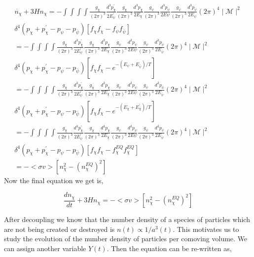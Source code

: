 \documentclass[12pt]{report}
\begin{document}
\begin{multline*}
\dot{n_\chi}+3Hn_\chi = -\int \int \int \int \frac{g_\chi}{(2 \pi)^3} \frac{d^3p^\prime_\chi}{2E^\prime_\psi} \frac{g_\chi}{(2 \pi)^3} \frac{d^3p_\chi}{2E_\chi} \frac{g_\psi}{(2 \pi)^3} \frac{d^3p_\psi}{2E\psi} \frac{g_{\bar{\psi}}}{(2 \pi)^3} \frac{d^3p_{\bar{\psi}}}{2E_{\bar{\psi}}} (2 \pi)^4 \mid \mathcal{M} \mid^2 \\
\delta^4(p_\chi + p^\prime_\chi - p_\psi - p_{\bar{\psi}})\left[f_\chi f_\chi- f_\psi f_{\bar{\psi}} \right] \\
= -\int \int \int \int \frac{g_\chi}{(2 \pi)^3} \frac{d^3p ^\prime_\chi}{2E^\prime_\psi} \frac{g_\chi}{(2 \pi)^3} \frac{d^3p_\chi}{2E_\chi} \frac{g_\psi}{(2 \pi)^3} \frac{d^3p_\psi}{2E\psi} \frac{g_{\bar{\psi}}}{(2 \pi)^3} \frac{d^3p_{\bar{\psi}}}{2E_{\bar{\psi}}} (2 \pi)^4 \mid \mathcal{M} \mid^2 \\
\delta^4(p_\chi + p^\prime_\chi - p_\psi - p_{\bar{\psi}})\left[f_\chi f_\chi-e^{-(E_\psi+E_{\bar{\psi}})/T} \right]\\
= -\int \int \int \int \frac{g_\chi}{(2 \pi)^3} \frac{d^3p ^\prime_\chi}{2E^\prime_\psi} \frac{g_\chi}{(2 \pi)^3} \frac{d^3p_\chi}{2E_\chi} \frac{g_\psi}{(2 \pi)^3} \frac{d^3p_\psi}{2E\psi} \frac{g_{\bar{\psi}}}{(2 \pi)^3} \frac{d^3p_{\bar{\psi}}}{2E_{\bar{\psi}}} (2 \pi)^4 \mid \mathcal{M} \mid^2 \\
\delta^4(p_\chi + p^\prime_\chi - p_\psi - p_{\bar{\psi}})\left[f_\chi f_\chi-e^{-(E_\chi+ E^\prime _\chi)/T} \right]\\
=-\int \int \int \int \frac{g_\chi}{(2 \pi)^3} \frac{d^3p ^\prime_\chi}{2E^\prime_\psi} \frac{g_\chi}{(2 \pi)^3} \frac{d^3p_\chi}{2E_\chi} \frac{g_\psi}{(2 \pi)^3} \frac{d^3p_\psi}{2E\psi} \frac{g_{\bar{\psi}}}{(2 \pi)^3} \frac{d^3p_{\bar{\psi}}}{2E_{\bar{\psi}}} (2 \pi)^4 \mid \mathcal{M} \mid^2 \\
\delta^4(p_\chi + p^\prime_\chi - p_\psi - p_{\bar{\psi}})\left[f_\chi f_\chi- f^{EQ}_\chi f^{EQ}_\chi \right]\\
=-<\sigma  v > \left[ n^2_\chi -(n^{EQ}_\chi)^2 \right]
\end{multline*}
Now the final equation we get is,

\begin{equation}
\frac{dn_\chi}{dt}+3Hn_\chi = -<\sigma  v> [ n^2_\chi -(n^{EQ}_\chi)^2]
\end{equation}

After decoupling we know that the number density of a species of particles which are not being created or destroyed is $n(t) \propto 1/ a^3(t)$. This motivates us to study the evolution of the number density of particles per comoving volume. We can assign another variable $Y(t)$. Then the equation can be re-written as,
\end{document}
